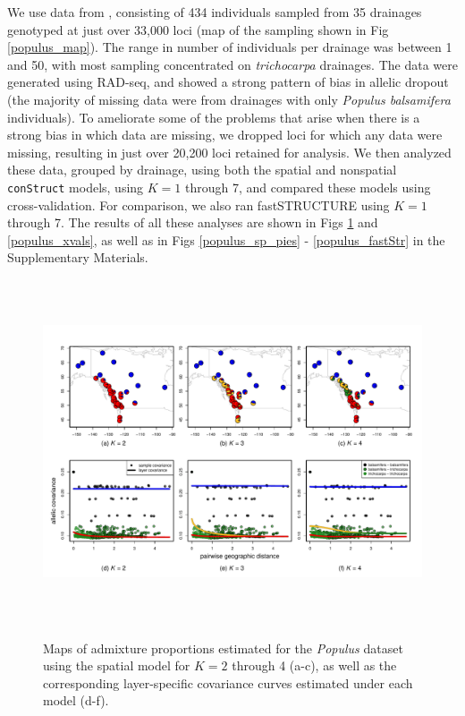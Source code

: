 \documentclass[10pt,letterpaper]{article}
\newcommand{\tri}{\textit{trichocarpa}}
\begin{document}
We use data from \cite{geraldes_etal_2014}, 
consisting of 434 individuals sampled from 35 drainages 
genotyped at just over 33,000 loci (map of the sampling shown in Fig \ref{populus_map}).
The range in number of individuals per drainage was between 1 and 50, 
with most sampling concentrated on \tri{} drainages.
The data were generated using RAD-seq, 
and showed a strong pattern of bias in allelic dropout 
(the majority of missing data were from drainages with only \textit{Populus balsamifera} individuals).
To ameliorate some of the problems that arise when there is a strong bias in which data are missing, 
we dropped loci for which any data were missing, 
resulting in just over 20,200 loci retained for analysis.  
We then analyzed these data, grouped by drainage, using both the spatial and nonspatial \texttt{conStruct} models, 
using $K = 1$ through 7,
and compared these models using cross-validation.
For comparison, we also ran fastSTRUCTURE \cite{fastStructure} 
using $K = 1$ through 7.
The results of all these analyses are shown in 
Figs \ref{populus_pies} and \ref{populus_xvals}, 
as well as in Figs \ref{populus_sp_pies} - \ref{populus_fastStr} in the Supplementary Materials.

\begin{figure}
	\centering
		{\includegraphics[width=6in,height=4in]{figs/populus/pop_sp_results.pdf}}
	\caption{
	Maps of admixture proportions estimated for the \textit{Populus} dataset 
	using the spatial model for $K=2$ through 4 (a-c), 
	as well as the corresponding layer-specific covariance curves estimated under each model (d-f).
    }\label{populus_pies}
\end{figure}
\end{document}
